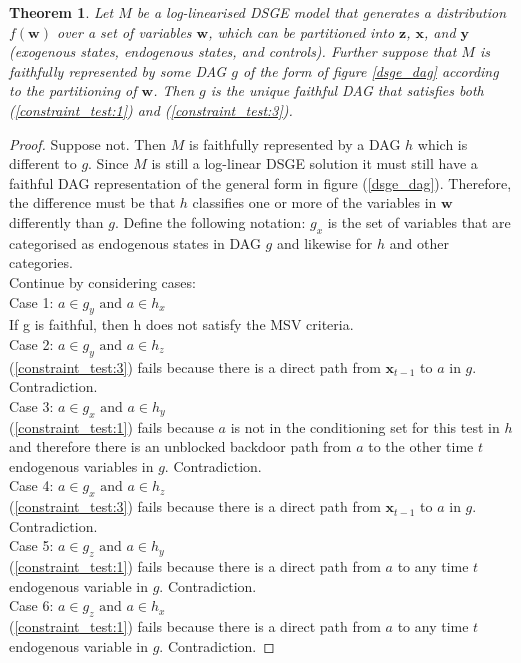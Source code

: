 \documentclass{article}
\newtheorem{theorem}{Theorem}
\begin{document}
\theoremstyle{definition}
\begin{theorem}
  Let $M$ be a log-linearised DSGE model that generates a distribution $f(\mathbf{w})$ over a set of variables $\mathbf{w}$, which can be partitioned into $\mathbf{z}$, $\mathbf{x}$, and $\mathbf{y}$ (exogenous states, endogenous states, and controls). Further suppose that $M$ is \textit{faithfully represented} by some DAG $g$ of the form of figure \ref{dsge_dag} according to the partitioning of $\mathbf{w}$. Then $g$ is the unique faithful DAG that satisfies both (\ref{constraint_test:1}) and (\ref{constraint_test:3}).
  
\end{theorem}
\begin{proof}
  Suppose not. Then $M$ is faithfully represented by a DAG $h$ which is different to $g$. Since $M$ is still a log-linear DSGE solution it must still have a faithful DAG representation of the general form in figure (\ref{dsge_dag}). Therefore, the difference must be that $h$ classifies one or more of the variables in $\mathbf{w}$ differently than $g$. Define the following notation: $g_x$ is the set of variables that are categorised as endogenous states in DAG  $g$ and likewise for $h$ and other categories. \\
  Continue by considering cases: \\
  Case 1: $a \in g_y \text{ and } a \in h_x$ \\
    If g is faithful, then h does not satisfy the MSV criteria. \\
  Case 2: $a \in g_y \text{ and } a \in h_z$ \\
    (\ref{constraint_test:3}) fails because there is a direct path from $\mathbf{x}_{t-1}$ to $a$ in $g$. Contradiction. \\
  Case 3: $a \in g_x \text{ and } a \in h_y$ \\
    (\ref{constraint_test:1}) fails because $a$ is not in the conditioning set for this test in $h$ and therefore there is an unblocked backdoor path from $a$ to the other time $t$ endogenous variables in $g$. Contradiction. \\
  Case 4: $a \in g_x \text{ and } a \in h_z$ \\
    (\ref{constraint_test:3}) fails because there is a direct path from $\mathbf{x}_{t-1}$ to $a$ in $g$. Contradiction. \\
  Case 5: $a \in g_z \text{ and } a \in h_y$ \\
    (\ref{constraint_test:1}) fails because there is a direct path from $a$ to any time $t$ endogenous variable in $g$. Contradiction. \\
  Case 6: $a \in g_z \text{ and } a \in h_x$ \\
    (\ref{constraint_test:1}) fails because there is a direct path from $a$ to any time $t$ endogenous variable in $g$. Contradiction. 
\end{proof}
\end{document}

